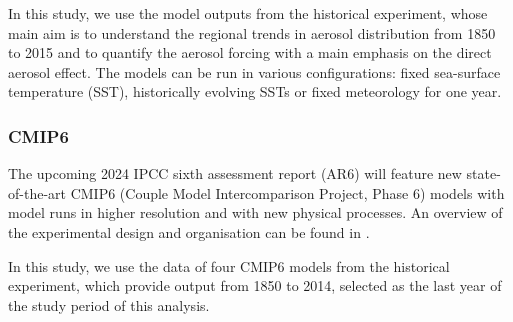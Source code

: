 \documentclass[journal abbreviation, manuscript]{copernicus}
\begin{document}
In this study, we use the model outputs from the historical experiment, whose main aim is to understand the regional trends in aerosol distribution from 1850 to 2015 and to quantify the aerosol forcing with a main emphasis on the direct aerosol effect. The models can be run in various configurations: fixed sea-surface temperature (SST), historically evolving SSTs or fixed meteorology for one year. 

\subsubsection{CMIP6}
The upcoming 2024 IPCC sixth assessment report (AR6) will feature new state-of-the-art CMIP6 (Couple Model Intercomparison Project, Phase 6) models with model runs in higher resolution and with new physical processes. An overview of the experimental design and organisation can be found in \cite{eyring2016overview}. 

In this study, we use the data of four CMIP6 models from the historical experiment, which provide output from 1850 to 2014, selected as the last year of the study period of this analysis.
\end{document}
